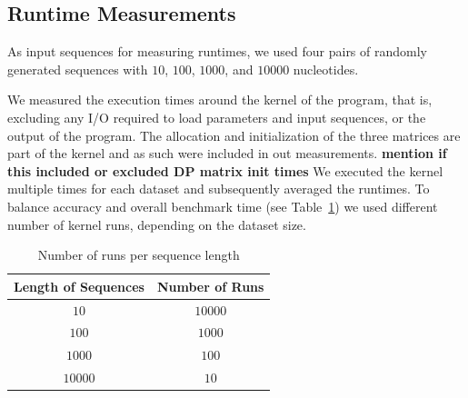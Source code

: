 \documentclass[runningheads,a4paper]{llncs}
\begin{document}
\subsection{Runtime Measurements}
\label{team2-runtimes}

As input sequences for measuring runtimes,  we used four pairs of randomly generated sequences with $10$, $100$, $1000$, and $10000$ nucleotides. 

We measured the execution times around the kernel of the program, that is, excluding any I/O required to load parameters and input sequences, or the output of the program. The allocation and initialization of the three matrices are part of the kernel and as such were included in out measurements.
{\bf mention if this included or excluded DP matrix init times}
We executed the kernel multiple times for each dataset and subsequently averaged the runtimes. 
To balance accuracy and overall benchmark time (see Table~\ref{fig:runs}) we used different number of kernel runs, depending on the dataset size.

\begin{table}
\centering

\begin{tabular}{|c|c|}
\hline 
Length of Sequences & Number of Runs \\ 
\hline 
$10$ & $10000$ \\ 
\hline 
$100$ & $1000$ \\ 
\hline 
$1000$ & $100$ \\ 
\hline 
$10000$ & $10$ \\ 
\hline 
\end{tabular}
\caption{Number of runs per sequence length}
\label{fig:runs}
\end{table}
\end{document}
